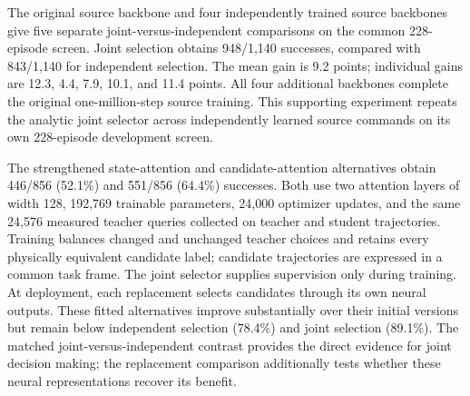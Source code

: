 \documentclass[journal]{IEEEtran}
\begin{document}
The original source backbone and four independently trained source backbones give five separate joint-versus-independent comparisons on the common 228-episode screen. Joint selection obtains 948/1,140 successes, compared with 843/1,140 for independent selection. The mean gain is 9.2 points; individual gains are 12.3, 4.4, 7.9, 10.1, and 11.4 points. All four additional backbones complete the original one-million-step source training. This supporting experiment repeats the analytic joint selector across independently learned source commands on its own 228-episode development screen.

The strengthened state-attention and candidate-attention alternatives obtain 446/856 (52.1\%) and 551/856 (64.4\%) successes. Both use two attention layers of width 128, 192,769 trainable parameters, 24,000 optimizer updates, and the same 24,576 measured teacher queries collected on teacher and student trajectories. Training balances changed and unchanged teacher choices and retains every physically equivalent candidate label; candidate trajectories are expressed in a common task frame. The joint selector supplies supervision only during training. At deployment, each replacement selects candidates through its own neural outputs. These fitted alternatives improve substantially over their initial versions but remain below independent selection (78.4\%) and joint selection (89.1\%). The matched joint-versus-independent contrast provides the direct evidence for joint decision making; the replacement comparison additionally tests whether these neural representations recover its benefit.
\end{document}
